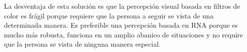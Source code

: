 \begin{itemize}
	La desventaja de esta solución es que la percepción visual basada en filtros de color es frágil porque requiere que la persona a seguir se vista de una determinada manera. Es preferible una percepción basada en RNA porque es mucho más robusta, funciona en un amplio abanico de situaciones y no require que la persona se vista de ninguna manera especial.
\end{itemize}

